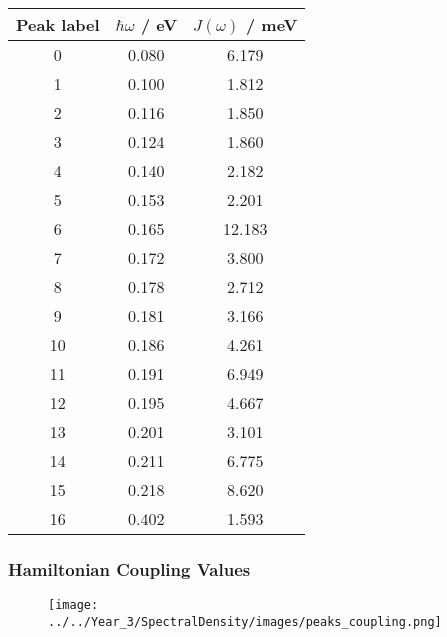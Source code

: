 \begin{table}
    \centering
    \begin{tabular}{||c c c||}
        \hline
        Peak label & $\hbar \omega$ / eV & $J\left(\omega\right)$ / meV \\
        \hline\hline
        
         0 & 0.080 & 6.179 \\
         1 & 0.100 & 1.812 \\
         2 & 0.116 & 1.850 \\
         3 & 0.124 & 1.860 \\
         4 & 0.140 & 2.182 \\
         5 & 0.153 & 2.201 \\
         6 & 0.165 & 12.183 \\
         7 & 0.172 & 3.800 \\
         8 & 0.178 & 2.712 \\
         9 & 0.181 & 3.166 \\
         10 & 0.186 & 4.261 \\
         11 & 0.191 & 6.949 \\
         12 & 0.195 & 4.667 \\
         13 & 0.201 & 3.101 \\
         14 & 0.211 & 6.775 \\
         15 & 0.218 & 8.620 \\
         16 & 0.402 & 1.593 \\
        \hline 
    \end{tabular}
\end{table}

\afterpartskip
\subsubsection{Hamiltonian Coupling Values}
\label{subsubsec:specdens_coupling}

\begin{figure}
    \centering
    \texttt{[image: ../../Year\_3/SpectralDensity/images/peaks\_coupling.png]}
\end{figure}

